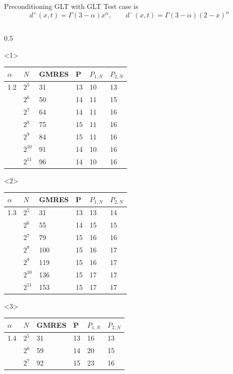 \documentclass[aspectratio=169,xcolor=dvipsnames]{beamer}
\begin{document}
\begin{frame}{Preconditioning GLT with GLT}
Test case is
\[
d^+(x,t) = \Gamma(3-\alpha)x^\alpha, \qquad d^-(x,t) = \Gamma(3-\alpha) (2-x)^\alpha 
\]\vspace{-0.5em}
\begin{columns}
\begin{column}{0.5\columnwidth}\centering
\begin{onlyenv}<1>
\begin{tabular}{llllll}
	\toprule
	$\alpha$ & $N$ & GMRES & P & $P_{1,N}$ & $P_{2,N}$ \\
	\midrule
	1.2 & $2^{5}$ & 31 & 13 & 10 & 13\\
	& $2^{6}$ & 50 & 14 & 11 & 15 \\
	& $2^{7}$ & 64 & 14 & 11 & 16 \\
	& $2^{8}$ & 75 & 15 & 11 & 16 \\
	& $2^{9}$ & 84 & 15 & 11 & 16 \\
	& $2^{10}$ & 91 & 14 & 10 & 16 \\
	& $2^{11}$ & 96 & 14 & 10 & 16 \\
	\bottomrule
\end{tabular}
\end{onlyenv}
\begin{onlyenv}<2>
	\begin{tabular}{llllll}
		\toprule
		$\alpha$ & $N$ & GMRES & P & $P_{1,N}$ & $P_{2,N}$ \\
		\midrule
 1.3 & $2^{5}$ & 31 & 13 & 13 & 14\\
& $2^{6}$ & 55 & 14 & 15 & 15 \\
& $2^{7}$ & 79 & 15 & 16 & 16 \\
& $2^{8}$ & 100 & 15 & 16 & 17 \\
& $2^{9}$ & 119 & 15 & 16 & 17 \\
& $2^{10}$ & 136 & 15 & 17 & 17 \\
& $2^{11}$ & 153 & 15 & 17 & 17 \\
		\bottomrule
	\end{tabular}
\end{onlyenv}
\begin{onlyenv}<3>
	\begin{tabular}{llllll}
		\toprule
		$\alpha$ & $N$ & GMRES & P & $P_{1,N}$ & $P_{2,N}$ \\
		\midrule
 1.4 & $2^{5}$ & 31 & 13 & 16 & 13\\
& $2^{6}$ & 59 & 14 & 20 & 15 \\
& $2^{7}$ & 92 & 15 & 23 & 16 \\

\end{tabular}
\end{onlyenv}
\end{column}
\end{columns}
\end{frame}
\end{document}
